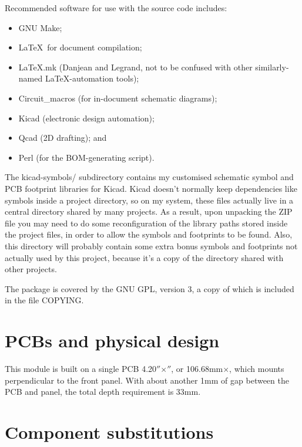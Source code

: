 Recommended software for use with the source code includes:
\begin{itemize}
  \item GNU Make;
  \item \LaTeX\ for document compilation;
  \item LaTeX.mk (Danjean and Legrand, not to be confused with other
    similarly-named \LaTeX-automation tools);
  \item Circuit\_macros (for in-document schematic diagrams);
  \item Kicad (electronic design automation);
  \item Qcad (2D drafting); and
  \item Perl (for the BOM-generating script).
\end{itemize}

The kicad-symbols/ subdirectory contains my customised schematic symbol and
PCB footprint libraries for Kicad.  Kicad doesn't normally keep dependencies
like symbols inside a project directory, so on my system, these files
actually live in a central directory shared by many projects.  As a result,
upon unpacking the ZIP file you may need to do some reconfiguration of the
library paths stored inside the project files, in order to allow the symbols
and footprints to be found.  Also, this directory will probably contain some
extra bonus symbols and footprints not actually used by this project,
because it's a copy of the directory shared with other projects.

The package is covered by the GNU GPL, version 3, a copy of which is
included in the file COPYING.

\section{PCBs and physical design}

This module is built on a single PCB
4.20$''$\linebreak[0]$\times$$''$, or
106.68mm\linebreak[0]$\times$\linebreak[0]31.75mm, which mounts
perpendicular to the front panel.  With about another 1mm
of gap between the PCB and panel, the total depth requirement is 33mm.

\section{Component substitutions}


